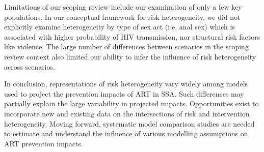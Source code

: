 Limitations of our scoping review include our examination of only a few key populations.
In our conceptual framework for risk heterogeneity, we did not explicitly examine heterogeneity
by type of sex act (i.e. anal sex) which is associated with higher probability of HIV transmission,
nor structural risk factors like violence.
The large number of differences between scenarios in the scoping review context
also limited our ability to infer the influence of risk heterogeneity across scenarios.

In conclusion, representations of risk heterogeneity vary widely
among models used to project the prevention impacts of ART in SSA.
Such differences may partially explain the large variability in projected impacts.
Opportunities exist to incorporate new and existing data on
the intersections of risk and intervention heterogeneity.
Moving forward, systematic model comparison studies are needed to
estimate and understand the influence of various modelling assumptions on ART prevention impacts.
